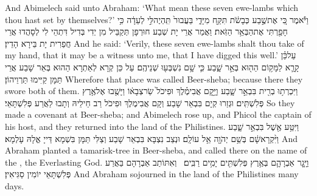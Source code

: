 {And Abimelech said unto Abraham: ‘What mean these seven ewe-lambs which thou hast set by themselves?’}{}
{וַיֹּ֕אמֶר כִּ֚י אֶת\maqqaf שֶׁ֣בַע כְּבָשֹׂ֔ת תִּקַּ֖ח מִיָּדִ֑י בַּעֲבוּר֙ תִּֽהְיֶה\maqqaf לִּ֣י לְעֵדָ֔ה כִּ֥י חָפַ֖רְתִּי אֶת\maqqaf הַבְּאֵ֥ר הַזֹּֽאת׃}
{וַאֲמַר אֲרֵי יָת שְׁבַע חוּרְפָן תְּקַבֵּיל מִן יְדִי בְּדִיל דִּתְהֵי לִי לְסָהֲדוּ אֲרֵי חֲפַרִית יָת בֵּירָא הָדֵין׃}
{And he said: ‘Verily, these seven ewe-lambs shalt thou take of my hand, that it may be a witness unto me, that I have digged this well.’}{}
{עַל\maqqaf כֵּ֗ן קָרָ֛א לַמָּק֥וֹם הַה֖וּא בְּאֵ֣ר שָׁ֑בַע כִּ֛י שָׁ֥ם נִשְׁבְּע֖וּ שְׁנֵיהֶֽם׃}
{עַל כֵּן קְרָא לְאַתְרָא הַהוּא בְּאֵר שָׁבַע אֲרֵי תַּמָּן קַיִּימוּ תַּרְוֵיהוֹן׃}
{Wherefore that place was called Beer-sheba; because there they swore both of them.}{}
{וַיִּכְרְת֥וּ בְרִ֖ית בִּבְאֵ֣ר שָׁ֑בַע וַיָּ֣קׇם אֲבִימֶ֗לֶךְ וּפִיכֹל֙ שַׂר\maqqaf צְבָא֔וֹ וַיָּשֻׁ֖בוּ אֶל\maqqaf אֶ֥רֶץ פְּלִשְׁתִּֽים׃}
{וּגְזַרוּ קְיָם בִּבְאֵר שָׁבַע וְקָם אֲבִימֶלֶךְ וּפִיכֹל רַב חֵילֵיהּ וְתָבוּ לַאֲרַע פְּלִשְׁתָּאֵי׃}
{So they made a covenant at Beer-sheba; and Abimelech rose up, and Phicol the captain of his host, and they returned into the land of the Philistines.}{}
{וַיִּטַּ֥ע אֶ֖שֶׁל בִּבְאֵ֣ר שָׁ֑בַע וַיִּ֨קְרָא\maqqaf שָׁ֔ם בְּשֵׁ֥ם יְהֹוָ֖ה אֵ֥ל עוֹלָֽם׃}
{וּנְצַב נִצְבָּא בִּבְאֵר שָׁבַע וְצַלִּי תַּמָּן בִּשְׁמָא דַּייָ אֱלָהּ עָלְמָא׃}
{And Abraham planted a tamarisk-tree in Beer-sheba, and called there on the name of the \lord, the Everlasting God.}{}
{וַיָּ֧גׇר אַבְרָהָ֛ם בְּאֶ֥רֶץ פְּלִשְׁתִּ֖ים יָמִ֥ים רַבִּֽים׃ \petucha }
{וְאִתּוֹתַב אַבְרָהָם בַּאֲרַע פְּלִשְׁתָּאֵי יוֹמִין סַגִּיאִין׃}
{And Abraham sojourned in the land of the Philistines many days.}{}

